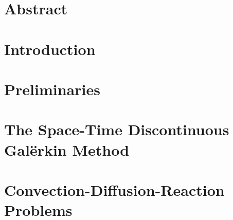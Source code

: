 \documentclass[12pt, oneside]{book}
\title{\documenttitle}
\date{\documentdate}
\begin{document}

	


    \newpage
    


    \chapter*{Abstract}
    


    \newpage
    \tableofcontents
    \thispagestyle{plain}



    \newpage
    \chapter*{Introduction}


    


    \newpage
    \chapter{Preliminaries}

    


    \newpage
    \chapter{The Space-Time Discontinuous Galërkin Method} \label{chapter:dg}

    


    \newpage
    \chapter{Convection-Diffusion-Reaction Problems} \label{chapter:cdr}
\end{document}
